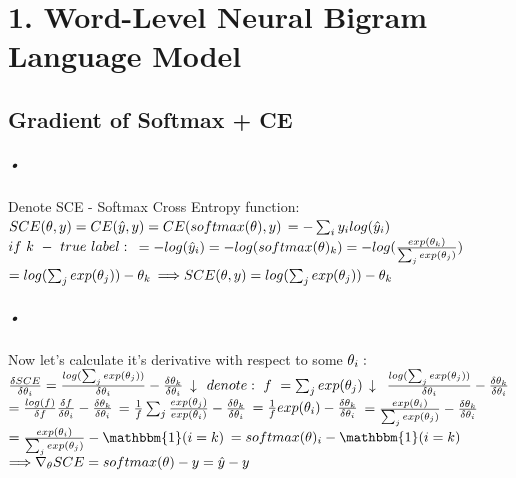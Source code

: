 \documentclass{article}
\begin{document}
\section*{1. Word-Level Neural Bigram Language Model}
\subsection{Gradient of Softmax + CE}
\subparagraph{•}
Denote SCE - Softmax Cross Entropy function:\\
$SCE(\theta, y) = CE(\hat{y}, y) = CE(softmax(\theta), y) \\$
$= -\sum_{i} y_i log(\hat{y}_i)\\$
$if \ k \ - \ true \ label:\\$
$= - log(\hat{y}_i) = -log(softmax(\theta)_k) = -log(\frac{exp(\theta_k)}{\sum_{j}exp(\theta_j)})\\$
$= log(\sum_{j}exp(\theta_j))-\theta_k\\$
$\Longrightarrow SCE(\theta, y) = log(\sum_{j}exp(\theta_j))-\theta_k\\$

\subparagraph{•}
Now let's calculate it's derivative with respect to some $\theta_i:\\$
$\frac{\delta SCE}{\delta \theta_i} = \frac{log(\sum_{j}exp(\theta_j))}{\delta \theta_i} -\frac{\delta \theta_k}{\delta \theta_i}\\$
$\downarrow \\$
$denote: \ f \ = \sum_{j}exp(\theta_j)\\ $
$\downarrow \\$
$\frac{log(\sum_{j}exp(\theta_j))}{\delta \theta_i} -\frac{\delta \theta_k}{\delta \theta_i}\\$
$= \frac{log(f)}{\delta f}\frac{\delta f}{\delta \theta_i} -\frac{\delta \theta_k}{\delta \theta_i}\\$
$= \frac{1}{f} \sum_{j} \frac{exp(\theta_j)}{exp(\theta_i)} -\frac{\delta \theta_k}{\delta \theta_i}\\$
$= \frac{1}{f} exp(\theta_i) -\frac{\delta \theta_k}{\delta \theta_i}\\$
$= \frac{exp(\theta_i)}{\sum_{j} exp(\theta_j)}-\frac{\delta \theta_k}{\delta \theta_i}\\$
$= \frac{exp(\theta_i)}{\sum_{j} exp(\theta_j)} - \mathbbm{1}(i=k)\\$
$= softmax(\theta)_i - \mathbbm{1}(i=k)\\$
$\Longrightarrow \nabla_\theta SCE = softmax(\theta) - y = \hat{y}-y\\$ 
\end{document}
